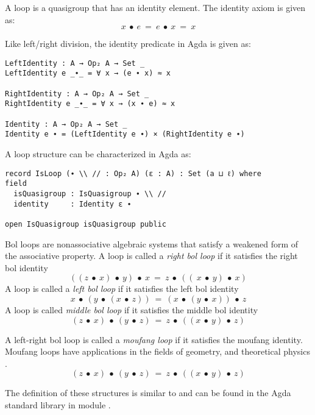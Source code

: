 A loop is a quasigroup that has an identity element. The identity axiom is given
as:
\begin{equation}\label{eq_lineslope}
x\ ∙\ e\ =\ e\ ∙\ x\ =\ x
\end{equation}

Like left/right division, the identity predicate in Agda is given as:

\begin{verbatim}
LeftIdentity : A → Op₂ A → Set _
LeftIdentity e _∙_ = ∀ x → (e ∙ x) ≈ x

RightIdentity : A → Op₂ A → Set _
RightIdentity e _∙_ = ∀ x → (x ∙ e) ≈ x

Identity : A → Op₂ A → Set _
Identity e ∙ = (LeftIdentity e ∙) × (RightIdentity e ∙)
\end{verbatim}

A loop structure can be characterized in Agda as:

\begin{verbatim}
record IsLoop (∙ \\ // : Op₂ A) (ε : A) : Set (a ⊔ ℓ) where
field
  isQuasigroup : IsQuasigroup ∙ \\ //
  identity     : Identity ε ∙

open IsQuasigroup isQuasigroup public
\end{verbatim}

Bol loops are nonassociative algebraic systems that satisfy a weakened form of
the associative property. A loop is called a \textit{right bol loop} if it
satisfies the right bol identity
\[ ((z\ ∙\ x)\ ∙\ y)\ ∙\ x\ =\ z\ ∙\ ((\ x\ ∙\ y)\ ∙\ x)\]
A loop is called a \textit{left bol loop} if it satisfies the left bol identity
\[ x\ ∙\ (y\ ∙\ (x\ ∙\ z))\ =\ (x\ ∙\ (y\ ∙\ x))\ ∙\ z\]
A loop is called \textit{middle bol loop} if it satisfies the middle bol identity
\[(z\ ∙\ x)\ ∙\ (y\ ∙\ z)\ =\ z\ ∙\ ((x\ ∙\ y)\ ∙\ z)\] 

A left-right bol loop is called a \textit{moufang loop} if it satisfies the
moufang identity. Moufang loops have applications in the fields of geometry, and
theoretical physics \cite{kunen1996moufang}.
\[(z\ ∙\ x)\ ∙\ (y\ ∙\ z)\ =\ z\ ∙\ ((x\ ∙\ y)\ ∙\ z)\]

The definition of these structures is similar to  and can be
found in the Agda standard library in module .

